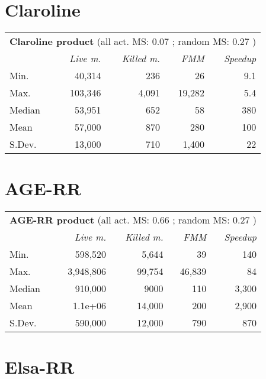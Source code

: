 \section{Claroline}

\begin{tabularx}{90mm}{X rrrr}
\hline	\multicolumn{5}{c}{ \textbf{Claroline  product} (all act. MS: 0.07 ; random MS: 0.27 )}	\\
	& \textit{Live m.}	& \textit{Killed m.} & \textit{FMM}& \textit{Speedup}\\
\hline Min. &  40,314   &  236   &  26    & 9.1 \\
Max. &  103,346   &  4,091   &  19,282    & 5.4 \\
Median			&  53,951   &  652   &  58    & 380 \\
Mean			&  57,000   &  870   &  280  & 100 \\
S.Dev.	&  13,000   &  710  &  1,400   &  22 \\
\hline
\end{tabularx}
%
%


\section{AGE-RR}

\begin{tabularx}{90mm}{X rrrr}
\hline	\multicolumn{5}{c}{ \textbf{AGE-RR  product} (all act. MS: 0.66 ; random MS: 0.27 )}	\\
	& \textit{Live m.}	& \textit{Killed m.} & \textit{FMM}& \textit{Speedup}\\
\hline Min. &  598,520   &  5,644   &  39    & 140 \\
Max. &  3,948,806   &  99,754   &  46,839    & 84 \\
Median			&  910,000   &  9000   &  110    & 3,300 \\
Mean			&  1.1e+06   &  14,000   &  200  & 2,900 \\
S.Dev.	&  590,000   &  12,000  &  790   &  870 \\
\hline
\end{tabularx}
%
%


\section{Elsa-RR}

